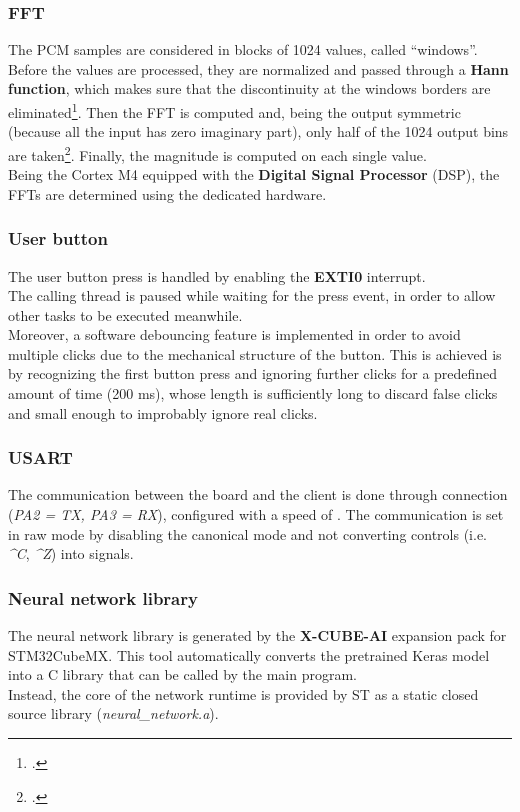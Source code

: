 \documentclass[12pt]{article}
\begin{document}
\subsubsection{FFT}
The PCM samples are considered in blocks of 1024 values, called ``windows''. Before the values are processed, they are normalized and passed through a \textbf{Hann function}, which makes sure that the discontinuity at the windows borders are eliminated\footcite{engelberg2008digital}. Then the FFT is computed and, being the output symmetric (because all the input has zero imaginary part), only half of the 1024 output bins are taken\footcite{parker2017digital}. Finally, the magnitude is computed on each single value.\\
Being the Cortex M4 equipped with the \textbf{Digital Signal Processor} (DSP), the FFTs are determined using the dedicated hardware.

\subsubsection{User button}
The user button press is handled by enabling the \textbf{EXTI0} interrupt.\\
The calling thread is paused while waiting for the press event, in order to allow other tasks to be executed meanwhile.\\
Moreover, a software debouncing feature is implemented in order to avoid multiple clicks due to the mechanical structure of the button. This is achieved is by recognizing the first button press and ignoring further clicks for a predefined amount of time (200 ms), whose length is sufficiently long to discard false clicks and small enough to improbably ignore real clicks.

\subsubsection{USART}
The communication between the board and the client is done through  connection (\textit{PA2 = TX, PA3 = RX}), configured with a speed of . The communication is set in raw mode by disabling the canonical mode and not converting controls (i.e. \textit{\^{}C}, \textit{\^{}Z}) into signals.

\subsubsection{Neural network library}
The neural network library is generated by the \textbf{X-CUBE-AI} expansion pack for STM32CubeMX. This tool automatically converts the pretrained Keras model into a C library that can be called by the main program.\\
Instead, the core of the network runtime is provided by ST as a static closed source library (\textit{neural\_network.a}).
\end{document}
